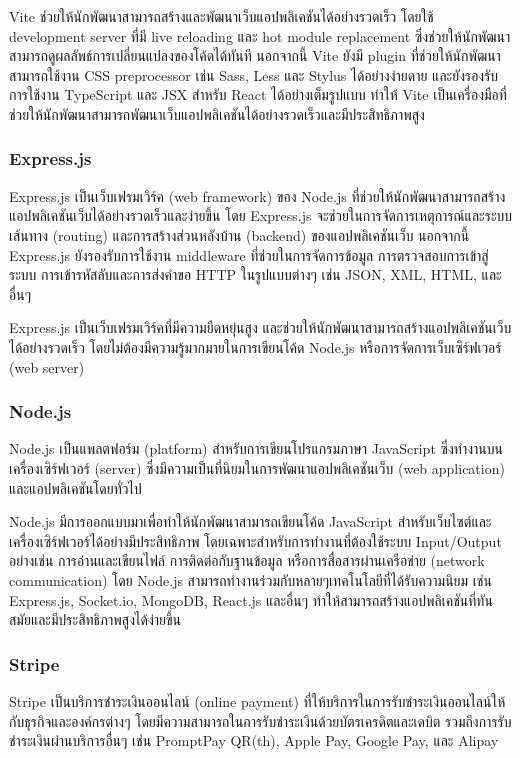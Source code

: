 Vite ช่วยให้นักพัฒนาสามารถสร้างและพัฒนาเว็บแอปพลิเคชันได้อย่างรวดเร็ว โดยใช้ development server ที่มี live reloading และ hot module replacement ซึ่งช่วยให้นักพัฒนาสามารถดูผลลัพธ์การเปลี่ยนแปลงของโค้ดได้ทันที นอกจากนี้ Vite ยังมี plugin ที่ช่วยให้นักพัฒนาสามารถใช้งาน CSS preprocessor เช่น Sass, Less และ Stylus ได้อย่างง่ายดาย และยังรองรับการใช้งาน TypeScript และ JSX สำหรับ React ได้อย่างเต็มรูปแบบ ทำให้ Vite เป็นเครื่องมือที่ช่วยให้นักพัฒนาสามารถพัฒนาเว็บแอปพลิเคชันได้อย่างรวดเร็วและมีประสิทธิภาพสูง
\subsubsection{Express.js~\cite{expressjs}}
Express.js เป็นเว็บเฟรมเวิร์ค (web framework) ของ Node.js ที่ช่วยให้นักพัฒนาสามารถสร้างแอปพลิเคชันเว็บได้อย่างรวดเร็วและง่ายขึ้น โดย Express.js จะช่วยในการจัดการเหตุการณ์และระบบเส้นทาง (routing) และการสร้างส่วนหลังบ้าน (backend) ของแอปพลิเคชันเว็บ นอกจากนี้ Express.js ยังรองรับการใช้งาน middleware ที่ช่วยในการจัดการข้อมูล การตรวจสอบการเข้าสู่ระบบ การเข้ารหัสลับและการส่งคำขอ HTTP ในรูปแบบต่างๆ เช่น JSON, XML, HTML, และอื่นๆ

Express.js เป็นเว็บเฟรมเวิร์คที่มีความยืดหยุ่นสูง และช่วยให้นักพัฒนาสามารถสร้างแอปพลิเคชันเว็บได้อย่างรวดเร็ว โดยไม่ต้องมีความรู้มากมายในการเขียนโค้ด Node.js หรือการจัดการเว็บเซิร์ฟเวอร์ (web server)
\subsubsection{Node.js~\cite{nodejs}}
Node.js เป็นแพลตฟอร์ม (platform) สำหรับการเขียนโปรแกรมภาษา JavaScript ซึ่งทำงานบนเครื่องเซิร์ฟเวอร์ (server) ซึ่งมีความเป็นที่นิยมในการพัฒนาแอปพลิเคชันเว็บ (web application) และแอปพลิเคชันโดยทั่วไป

Node.js มีการออกแบบมาเพื่อทำให้นักพัฒนาสามารถเขียนโค้ด JavaScript สำหรับเว็บไซต์และเครื่องเซิร์ฟเวอร์ได้อย่างมีประสิทธิภาพ โดยเฉพาะสำหรับการทำงานที่ต้องใช้ระบบ Input/Output อย่างเช่น การอ่านและเขียนไฟล์ การติดต่อกับฐานข้อมูล หรือการสื่อสารผ่านเครือข่าย (network communication) โดย Node.js สามารถทำงานร่วมกับหลายๆเทคโนโลยีที่ได้รับความนิยม เช่น Express.js, Socket.io, MongoDB, React.js และอื่นๆ ทำให้สามารถสร้างแอปพลิเคชันที่ทันสมัยและมีประสิทธิภาพสูงได้ง่ายขึ้น
\subsubsection{Stripe~\cite{stripe}}
Stripe เป็นบริการชำระเงินออนไลน์ (online payment) ที่ให้บริการในการรับชำระเงินออนไลน์ให้กับธุรกิจและองค์กรต่างๆ โดยมีความสามารถในการรับชำระเงินด้วยบัตรเครดิตและเดบิต รวมถึงการรับชำระเงินผ่านบริการอื่นๆ เช่น PromptPay QR(th), Apple Pay, Google Pay, และ Alipay

